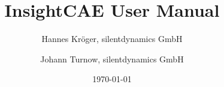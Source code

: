 \documentclass[a4paper]{scrartcl}
\begin{document}
\title{InsightCAE User Manual}
\date{\today}

\author{%
Hannes Kröger, silentdynamics GmbH 
\and Johann Turnow, silentdynamics GmbH}
        
\maketitle
        

\end{document}
